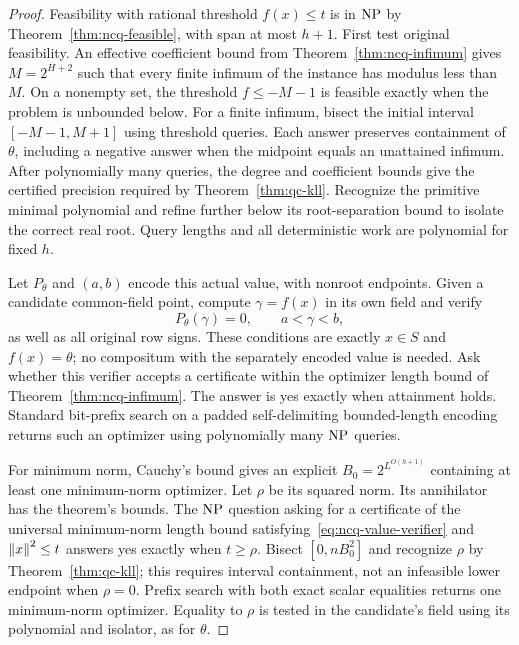 \begin{proof}
Feasibility with rational threshold $f(x)\le t$ is in $\mathrm{NP}$ by
Theorem~\ref{thm:ncq-feasible}, with span at most $h+1$.
First test original feasibility. An effective coefficient bound from
Theorem~\ref{thm:ncq-infimum} gives $M=2^{H+2}$ such that every finite
infimum of the instance has modulus less than $M$. On a nonempty set,
the threshold $f\le-M-1$ is feasible exactly when the problem is
unbounded below. For a finite infimum, bisect the initial interval
$[-M-1,M+1]$ using threshold queries. Each answer preserves containment
of $\theta$, including a negative answer when the midpoint equals an
unattained infimum. After polynomially many queries, the degree and
coefficient bounds give the certified precision required by
Theorem~\ref{thm:qc-kll}. Recognize the primitive minimal polynomial and
refine further below its root-separation bound to isolate the correct
real root. Query lengths and all deterministic work are polynomial for
fixed $h$.

Let $P_\theta$ and $(a,b)$ encode this actual value, with nonroot
endpoints. Given a candidate common-field point, compute $\gamma=f(x)$
in its own field and verify
\begin{equation}
\label{eq:ncq-value-verifier}
 P_\theta(\gamma)=0,\qquad a<\gamma<b,
\end{equation}
as well as all original row signs. These conditions are exactly
$x\in S$ and $f(x)=\theta$; no compositum with the separately encoded
value is needed. Ask whether this verifier accepts a certificate within
the optimizer length bound of Theorem~\ref{thm:ncq-infimum}. The answer
is yes exactly when attainment holds. Standard bit-prefix search on a
padded self-delimiting bounded-length encoding returns such an optimizer
using polynomially many $\mathrm{NP}$ queries.

For minimum norm, Cauchy's bound gives an explicit
$B_0=2^{L^{O(h+1)}}$ containing at least one minimum-norm optimizer.
Let $\rho$ be its squared norm. Its annihilator has the theorem's bounds.
The $\mathrm{NP}$ question asking for a certificate of the universal minimum-norm
length bound satisfying~\eqref{eq:ncq-value-verifier} and
$\left\lVert x\right\rVert^2\le t$ answers yes exactly when $t\ge\rho$. Bisect
$[0,nB_0^2]$ and recognize $\rho$ by Theorem~\ref{thm:qc-kll}; this
requires interval containment, not an infeasible lower endpoint when
$\rho=0$. Prefix search with both exact scalar equalities returns one
minimum-norm optimizer. Equality to $\rho$ is tested in the candidate's
field using its polynomial and isolator, as for $\theta$.


\end{proof}
